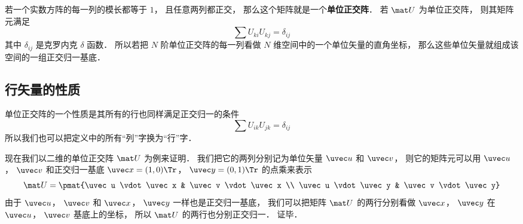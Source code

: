 

若一个实数方阵的每一列的模长都等于 $1$， 且任意两列都正交， 那么这个矩阵就是一个\textbf{单位正交阵}． 若 $\mat U$ 为单位正交阵， 则其矩阵元满足
\begin{equation}
\sum U_{ki} U_{kj} = \delta_{ij}
\end{equation}
其中 $\delta_{ij}$ 是克罗内克 $\delta$ 函数． 所以若把 $N$ 阶单位正交阵的每一列看做 $N$ 维空间中的一个单位矢量的直角坐标， 那么这些单位矢量就组成该空间的一组正交归一基底．

\subsection{行矢量的性质}
单位正交阵的一个性质是其所有的行也同样满足正交归一的条件
\begin{equation}
\sum U_{ik} U_{jk} = \delta_{ij}
\end{equation}
所以我们也可以把定义中的所有“列”字换为“行”字．

现在我们以二维的单位正交阵 $\mat U$ 为例来证明． 我们把它的两列分别记为单位矢量 $\uvec u$ 和 $\uvec v$， 则它的矩阵元可以用 $\uvec u$， $\uvec v$ 和正交归一基底 $\uvec x = (1, 0)\Tr$， $\uvec y = (0, 1)\Tr$ 的点乘来表示
\begin{equation}\label{UOrM_eq3}
\mat U = \pmat{\uvec u \vdot \uvec x & \uvec v \vdot \uvec x \\
\uvec u \vdot \uvec y & \uvec v \vdot \uvec y}
\end{equation}
由于 $\uvec u$， $\uvec v$ 和 $\uvec x$， $\uvec y$ 一样也是正交归一基底， 我们可以把矩阵 $\mat U$ 的两行分别看做 $\uvec x$， $\uvec y$ 在 $\uvec u$， $\uvec v$ 基底上的坐标， 所以 $\mat U$ 的两行也分别正交归一． 证毕．

